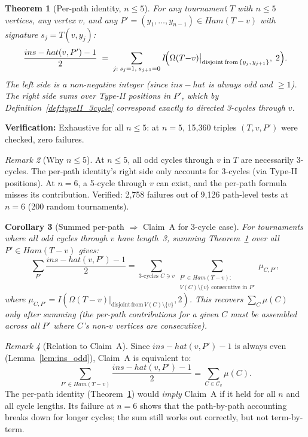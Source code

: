 \documentclass[12pt,reqno]{amsart}
\theoremstyle{plain}
\newtheorem{theorem}{Theorem}[section]
\newtheorem{corollary}[theorem]{Corollary}
\theoremstyle{definition}
\theoremstyle{remark}
\newtheorem{remark}[theorem]{Remark}
\newcommand{\Ham}{\mathrm{Ham}}
\newcommand{\inshat}{\widehat{\mathrm{ins}}}
\renewcommand{\Ham}{Ham}%
\renewcommand{\inshat}{ins-hat}%
\begin{document}
\begin{perpathbox}
\begin{theorem}[Per-path identity, $n \leq 5$]\label{thm:perpath_small}
For any tournament $T$ with $n \leq 5$ vertices, any vertex $v$, and any
$P' = (y_1, \ldots, y_{n-1}) \in \Ham(T{-}v)$ with signature $s_j = T(v,y_j)$:
\[
  \frac{\inshat(v,P') - 1}{2}
  \;=\;
  \sum_{\substack{j:\; s_j=1,\; s_{j+1}=0}}
    I\!\Bigl(\Omega(T{-}v)\big|_{\mathrm{disjoint\,from\,}\{y_j,\,y_{j+1}\}},\;2\Bigr).
\]
The left side is a non-negative integer (since $\inshat$ is always odd and
$\geq 1$). The right side sums over Type-II positions in $P'$, which by
Definition~\ref{def:typeII_3cycle} correspond exactly to directed 3-cycles
through $v$.
\end{theorem}
\end{perpathbox}

\noindent\textbf{Verification:} Exhaustive for all $n \leq 5$: at $n=5$,
15,360 triples $(T, v, P')$ were checked, zero failures.

\begin{remark}[Why $n \leq 5$]
At $n \leq 5$, all odd cycles through $v$ in $T$ are necessarily 3-cycles.
The per-path identity's right side only accounts for 3-cycles (via Type-II
positions). At $n=6$, a 5-cycle through $v$ can exist, and the per-path
formula misses its contribution. Verified: 2,758 failures out of 9,126
path-level tests at $n=6$ (200 random tournaments).
\end{remark}

\begin{corollary}[Summed per-path $\Rightarrow$ Claim~A for 3-cycle case]
\label{cor:perpath_sum}
For tournaments where all odd cycles through $v$ have length~3, summing
Theorem~\ref{thm:perpath_small} over all $P' \in \Ham(T{-}v)$ gives:
\[
  \sum_{P'} \frac{\inshat(v,P')-1}{2}
  = \sum_{\text{3-cycles }C\ni v}
    \sum_{\substack{P'\in\Ham(T{-}v):\\V(C)\setminus\{v\}\text{ consecutive in }P'}}
    \mu_{C,P'},
\]
where $\mu_{C,P'} = I(\Omega(T{-}v)|_{\mathrm{disjoint\,from\,}V(C)\setminus\{v\}},2)$.
This recovers $\sum_C \mu(C)$ only after summing (the per-path contributions
for a given $C$ must be assembled across all $P'$ where $C$'s non-$v$ vertices
are consecutive).
\end{corollary}

\begin{remark}[Relation to Claim~A]
Since $\inshat(v,P') - 1$ is always even (Lemma~\ref{lem:ins_odd}), Claim~A
is equivalent to:
\[
  \sum_{P' \in \Ham(T{-}v)} \frac{\inshat(v,P') - 1}{2} = \sum_{C \in \mathcal{C}_v} \mu(C).
\]
The per-path identity (Theorem~\ref{thm:perpath_small}) would \emph{imply} Claim~A
if it held for all $n$ and all cycle lengths. Its failure at $n=6$ shows that the
path-by-path accounting breaks down for longer cycles; the sum still works out
correctly, but not term-by-term.
\end{remark}
\end{document}
